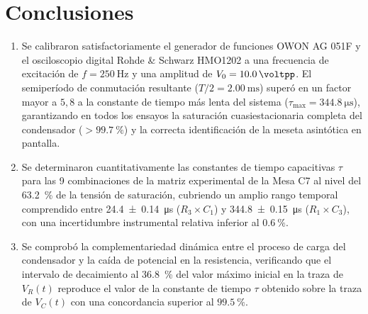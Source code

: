\section{Conclusiones}
\label{sec:conclusiones}

\begin{enumerate}
    \item Se calibraron satisfactoriamente el generador de funciones OWON AG 051F y el osciloscopio digital Rohde \& Schwarz HMO1202 a una frecuencia de excitación de $f = \qty{250}{\hertz}$ y una amplitud de $V_0 = \qty{10,0}{\voltpp}$. El semiperíodo de conmutación resultante ($T/2 = \qty{2,00}{\milli\second}$) superó en un factor mayor a $5{,}8$ a la constante de tiempo más lenta del sistema ($\tau_{\max} = \qty{344,8}{\micro\second}$), garantizando en todos los ensayos la saturación cuasiestacionaria completa del condensador ($> \qty{99,7}{\percent}$) y la correcta identificación de la meseta asintótica en pantalla.
    
    \item Se determinaron cuantitativamente las constantes de tiempo capacitivas $\tau$ para las 9 combinaciones de la matriz experimental de la Mesa C7 al nivel del \qty{63,2}{\percent} de la tensión de saturación, cubriendo un amplio rango temporal comprendido entre \qty{24,4 \pm 0,14}{\micro\second} ($R_3 \times C_1$) y \qty{344,8 \pm 0,15}{\micro\second} ($R_1 \times C_3$), con una incertidumbre instrumental relativa inferior al $\qty{0,6}{\percent}$.
    
    \item Se comprobó la complementariedad dinámica entre el proceso de carga del condensador y la caída de potencial en la resistencia, verificando que el intervalo de decaimiento al \qty{36,8}{\percent} del valor máximo inicial en la traza de $V_R(t)$ reproduce el valor de la constante de tiempo $\tau$ obtenido sobre la traza de $V_C(t)$ con una concordancia superior al $\qty{99,5}{\percent}$.
    

\end{enumerate}

